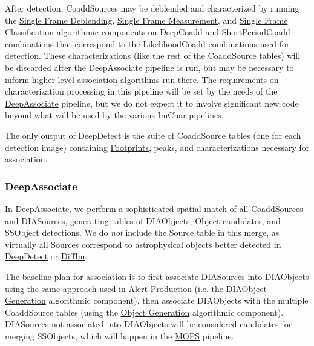 After detection, CoaddSources may be deblended and characterized by running the \hyperref[sec:acSingleFrameDeblending]{Single Frame Deblending}, \hyperref[sec:acSingleFrameMeasurement]{Single Frame Measurement}, and \hyperref[sec:acSingleFrameClassification]{Single Frame Classification} algorithmic components on DeepCoadd and ShortPeriodCoadd combinations that correspond to the LikelihoodCoadd combinations used for detection.  These characterizations (like the rest of the CoaddSource tables) will be discarded after the \hyperref[sec:drpDeepAssociate]{DeepAssociate} pipeline is run, but may be necessary to inform higher-level association algorithms run there.  The requirements on characterization processing in this pipeline will be set by the needs of the \hyperref[sec:drpDeepAssociate]{DeepAssociate} pipeline, but we do not expect it to involve significant new code beyond what will be used by the various ImChar pipelines.

The only output of DeepDetect is the suite of CoaddSource tables (one for each detection image) containing \hyperref[sec:spFootprints]{Footprints}, peaks, and characterizations necessary for association.

\subsubsection{DeepAssociate}
\label{sec:drpDeepAssociate}

In DeepAssociate, we perform a sophisticated spatial match of all CoaddSources and DIASources, generating tables of DIAObjects, Object candidates, and SSObject detections.  We do \emph{not} include the Source table in this merge, as virtually all Sources correspond to astrophysical objects better detected in \hyperref[sec:drpDeepDetect]{DeepDetect} or \hyperref[sec:drpDiffIm]{DiffIm}.

The baseline plan for association is to first associate DIASources into DIAObjects using the same approach used in Alert Production (i.e. the \hyperref[sec:acDIAObjectGeneration]{DIAObject Generation} algorithmic component), then associate DIAObjects with the multiple CoaddSource tables (using the \hyperref[sec:acObjectGeneration]{Object Generation} algorithmic component).  DIASources not associated into DIAObjects will be considered candidates for merging SSObjects, which will happen in the \hyperref[sec:drpMOPS]{MOPS} pipeline.

